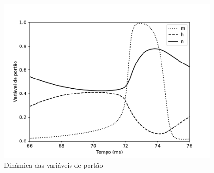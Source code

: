 \begin{figure}[htb!]
	\centering
	\caption{Dinâmica das variáveis de portão}
	\label{fig:portoes}
	\includegraphics[width=0.7\linewidth]{figs/portoes}
\end{figure}

